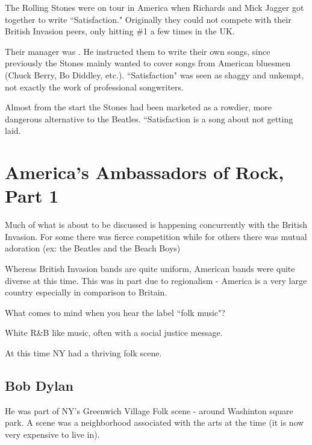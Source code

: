 \documentclass[12pt, a4paper, twoside, openright, titlepage]{book}
\begin{document}
The Rolling Stones were on tour in America when Richards and Mick Jagger got together to write ``Satisfaction." Originally they could not compete with their British Invasion peers, only hitting \#1 a few times in the UK.


Their manager was . He instructed them to write their own songs, since previously the Stones mainly wanted to cover songs from American bluesmen (Chuck Berry, Bo Diddley, etc.). ``Satisfaction" was seen as shaggy and unkempt, not exactly the work of professional songwriters.


Almost from the start the Stones had been marketed as a rowdier, more dangerous alternative to the Beatles. ``Satisfaction is a song about not getting laid.



\chapter{America's Ambassadors of Rock, Part 1}


Much of what is about to be discussed is happening concurrently with the British Invasion. For some there was fierce competition while for others there was mutual adoration (ex: the Beatles and the Beach Boys)

\begin{note}{}{}
    Whereas British Invasion bands are quite uniform, American bands were quite diverse at this time. This was in part due to regionalism - America is a very large country especially in comparison to Britain.
\end{note}


\begin{qst}{}{}
    What comes to mind when you hear the label ``folk music"?
\end{qst}

White R\&B like music, often with a social justice message.

\begin{rmk}{}{}
    At this time NY had a thriving folk scene.
\end{rmk}

\section{Bob Dylan}

He was part of NY's Greenwich Village Folk scene - around Washinton square park. A scene was a neighborhood associated with the arts at the time (it is now very expensive to live in).
\end{document}

